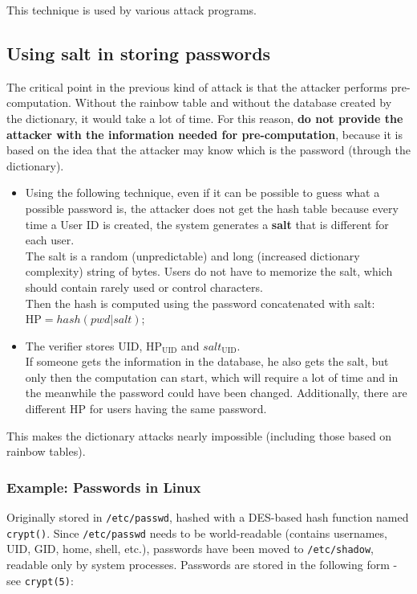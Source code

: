 This technique is used by various attack programs.


\subsection{Using salt in storing passwords}
The critical point in the previous kind of attack is that the attacker performs pre-computation. Without the rainbow
table and without the database created by the dictionary,
it would take a lot of time. For this reason, \textbf{do not provide the attacker with the information needed for pre-computation},
because it is based on the idea that the attacker may know which is the password (through the dictionary).

\begin{itemize}
  \item Using the following technique, even if it can be possible to guess what a possible password is, the attacker
        does not get the hash table because every time a User ID is created, the system generates a \textbf{salt} that is different for each user.\\
        The salt is a random (unpredictable) and long (increased dictionary complexity) string of bytes.
        Users do not have to memorize the salt, which should contain rarely used or control characters.\\
        Then the hash is computed using the password concatenated with salt:\\
        $\mathrm{HP} = hash(pwd | salt)$;
  \item The verifier stores UID,
        $\mathrm{HP}_{\mathrm{UID}}$ and $salt_{\mathrm{UID}}$.\\
        If someone gets the information in the database, he also gets the salt, but only then the
        computation can start, which will require a lot of time and in the meanwhile the password could have been
        changed. Additionally, there are different HP for users having the same password.
\end{itemize}

This makes the dictionary attacks nearly impossible (including those based on rainbow tables).


\subsubsection*{Example: Passwords in Linux}
Originally stored in \texttt{/etc/passwd}, hashed with a DES-based
hash function named \texttt{crypt()}.
Since \texttt{/etc/passwd} needs to be world-readable (contains
usernames, UID, GID, home, shell, etc.), passwords have been
moved to \texttt{/etc/shadow}, readable only by system processes.
Passwords are stored in the following form - see \texttt{crypt(5)}:

